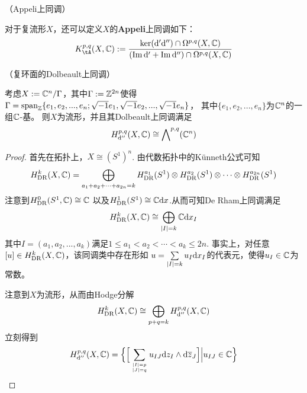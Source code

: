 
\begin{rem}（Appeli上同调）

对于复流形$X$，还可以定义$X$的\textbf{Appeli}上同调如下：
$$
  K^{p,q}_{\tA}(X,\bbC)
:=
  \frac{\ker(\td'\td'')\cap\Omg^{p,q}(X,\bbC)}
       {(\im\td'+\im\td'')\cap\Omg^{p,q}(X,\bbC)}
$$
\end{rem}


\begin{Example}（复环面的Dolbeault上同调）

考虑$X:=\mathbb{C}^n/\Gamma$，其中$\Gamma:=\mathbb{Z}^{2n}$使得
$\Gamma=\operatorname{span}_{\mathbb{Z}}\{e_1,e_2,...,e_n;\sqrt{-1} e_1,\sqrt{-1} e_2,...,\sqrt{-1} e_n\}$，
其中$\{e_1,e_2,...,e_n\}$为$\mathbb{C}^n$的一组$\mathbb{C}$-基。
则$X$为\Kahler 流形，并且其Dolbeault上同调满足
$$H^{p,q}_{\mathrm{d}''}(X,\mathbb{C})\cong\bigwedge\nolimits^{p,q}(\mathbb{C}^n)$$
\end{Example}

\begin{proof}首先在拓扑上，$X\cong (S^1)^n$.
由代数拓扑中的K\"{u}nneth公式可知
$$
  H^{k}_{\operatorname{DR}}(X,\mathbb{C})
=
  \bigoplus_{a_1+a_2+\cdots+a_{2n}=k}
    H^{a_1}_{\operatorname{DR}}(S^1)\otimes
    H^{a_2}_{\operatorname{DR}}(S^1)\otimes\cdots\otimes
    H^{a_{2n}}_{\operatorname{DR}}(S^1)
$$
注意到$H^0_{\operatorname{DR}}(S^1,\mathbb{C})\cong\mathbb{C}$
以及$H^1_{\operatorname{DR}}(S^1)\cong\mathbb{C}\mathrm{d} x$.从而可知De Rham上同调满足
$$
  H^k_{\operatorname{DR}}(X,\mathbb{C})
\cong
  \bigoplus_{|I|=k}\mathbb{C}\mathrm{d} x_I
$$
其中$I=(a_1,a_2,...,a_k)$满足$1\leq a_1<a_2<\cdots< a_k\leq 2n$.
事实上，对任意$[u]\in H^{k}_{\operatorname{DR}}(X,\mathbb{C})$，该同调类中存在形如
$u=\sum\limits_{|I|=k}u_I\mathrm{d} x_I$的代表元，使得$u_I\in\mathbb{C}$为常数。

注意到$X$为\Kahler 流形，从而由Hodge分解
$$H^k_{\operatorname{DR}}(X,\mathbb{C})\cong\bigoplus_{p+q=k}H^{p,q}_{\mathrm{d}''}(X,\mathbb{C})$$
立刻得到
$$
  H^{p,q}_{\mathrm{d}''}(X,\mathbb{C})
=
  \Big\{ \Big[\sum_{|I|=p\atop|J|=q}u_{IJ}\mathrm{d} z_I\wedge\mathrm{d}\overline{z}_J\Big] \Big| u_{IJ}\in\mathbb{C} \Big\}
$$
\end{proof}

